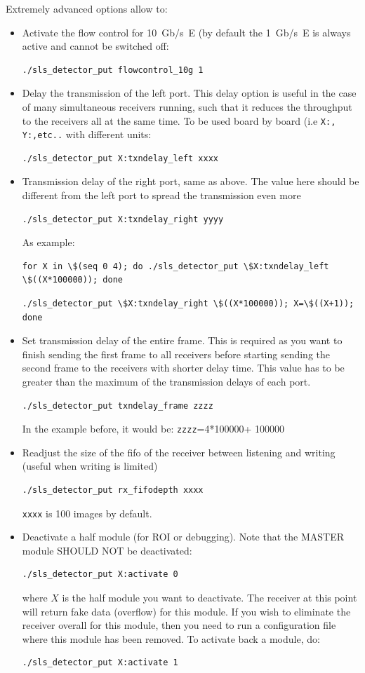 \documentclass{article}
\begin{document}
Extremely advanced options allow to:
\begin{itemize}
\item Activate the flow control for 10~Gb/s~E (by default the 1~Gb/s~E is always active and cannot be switched off:
\begin{verbatim}
./sls_detector_put flowcontrol_10g 1
\end{verbatim}
\item  Delay the transmission of the left port. This delay option is useful in the case of many simultaneous receivers running, such that it reduces the throughput to the receivers all at the same time. To be used board by board (i.e {\tt{X:, Y:,etc..}} with different units:
\begin{verbatim}
./sls_detector_put X:txndelay_left xxxx 
\end{verbatim}
\item  Transmission delay of the right port, same as above. The value here should be different from the left port to spread the transmission even more 
\begin{verbatim}
./sls_detector_put X:txndelay_right yyyy
\end{verbatim}
As example:
\begin{verbatim}
for X in \$(seq 0 4); do ./sls_detector_put \$X:txndelay_left \$((X*100000)); done
 \end{verbatim}
\begin{verbatim}
./sls_detector_put \$X:txndelay_right \$((X*100000)); X=\$((X+1)); done
\end{verbatim}

\item Set transmission delay of the entire frame. This is required as you want to finish sending the first frame to all receivers before starting sending the second frame to the receivers with shorter delay time.  This value has to be greater than the maximum of the transmission delays of each port.      
\begin{verbatim}
./sls_detector_put txndelay_frame zzzz
\end{verbatim}
In the example before, it would be: {\tt{zzzz}}=4*100000+ 100000

\item Readjust the size of the fifo of the receiver between listening and writing (useful when writing is limited)
\begin{verbatim}
./sls_detector_put rx_fifodepth xxxx
\end{verbatim}
 {\tt{xxxx}} is 100 images by default.
\item Deactivate a half module (for ROI or debugging). Note that the MASTER module SHOULD NOT be deactivated:
\begin{verbatim}
./sls_detector_put X:activate 0 
\end{verbatim}
where $X$ is the half module you want to deactivate.
The receiver at this point will return fake data (overflow) for this module. If you wish to eliminate the receiver overall for this module, then you need to run a configuration file where this module has been removed.
To activate back a module, do:
\begin{verbatim}
./sls_detector_put X:activate 1
\end{verbatim}


\end{itemize}
\end{document}
